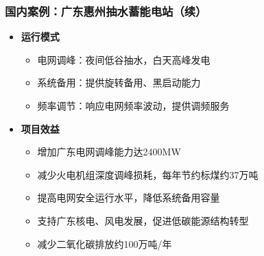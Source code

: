 \documentclass[aspectratio=169]{beamer}
\begin{document}
\begin{frame}
    \frametitle{国内案例：广东惠州抽水蓄能电站（续）}
    \begin{itemize}
        \item \textbf{运行模式}
        \begin{itemize}
            \item 电网调峰：夜间低谷抽水，白天高峰发电
            \item 系统备用：提供旋转备用、黑启动能力
            \item 频率调节：响应电网频率波动，提供调频服务
        \end{itemize}
        
        \item \textbf{项目效益}
        \begin{itemize}
            \item 增加广东电网调峰能力达2400MW
            \item 减少火电机组深度调峰损耗，每年节约标煤约37万吨
            \item 提高电网安全运行水平，降低系统备用容量
            \item 支持广东核电、风电发展，促进低碳能源结构转型
            \item 减少二氧化碳排放约100万吨/年
        \end{itemize}
    \end{itemize}
\end{frame}
\end{document}
